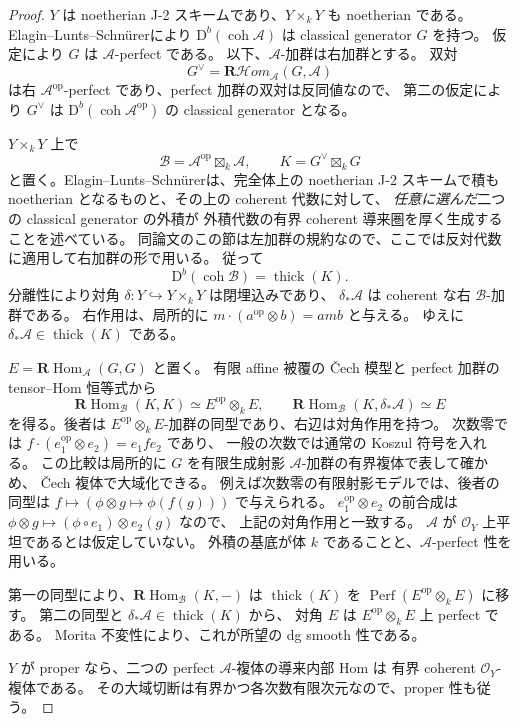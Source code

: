 \begin{proof}
$Y$ は noetherian J-2 スキームであり、$Y\times_kY$ も noetherian である。
Elagin--Lunts--Schn\"urer\cite[Theorem~4.15]{ELSSmoothAlgebras}により
$\mathrm D^b(\operatorname{coh}\mathscr A)$ は classical generator $G$ を持つ。
仮定により $G$ は $\mathscr A$-perfect である。
以下、$\mathscr A$-加群は右加群とする。
双対
\[
 G^\vee=\mathbf R\mathcal Hom_{\mathscr A}(G,\mathscr A)
\]
は右 $\mathscr A^{\mathrm{op}}$-perfect であり、perfect 加群の双対は反同値なので、
第二の仮定により $G^\vee$ は
$\mathrm D^b(\operatorname{coh}\mathscr A^{\mathrm{op}})$ の classical generator となる。

$Y\times_kY$ 上で
\[
 \mathscr B=\mathscr A^{\mathrm{op}}\boxtimes_k\mathscr A,
 \qquad K=G^\vee\boxtimes_kG
\]
と置く。Elagin--Lunts--Schn\"urer\cite[Theorem~4.18(b)]{ELSSmoothAlgebras}は、完全体上の
noetherian J-2 スキームで積も noetherian となるものと、その上の coherent 代数に対して、
\emph{任意に選んだ}二つの classical generator の外積が
外積代数の有界 coherent 導来圏を厚く生成することを述べている。
同論文のこの節は左加群の規約なので、ここでは反対代数に適用して右加群の形で用いる。
従って
\[
 \mathrm D^b(\operatorname{coh}\mathscr B)=\operatorname{thick}(K).
\]
分離性により対角 $\delta:Y\hookrightarrow Y\times_kY$ は閉埋込みであり、
$\delta_*\mathscr A$ は coherent な右 $\mathscr B$-加群である。
右作用は、局所的に
$m\cdot(a^{\mathrm{op}}\otimes b)=amb$ と与える。
ゆえに $\delta_*\mathscr A\in\operatorname{thick}(K)$ である。

$E=\mathbf R\operatorname{Hom}_{\mathscr A}(G,G)$ と置く。
有限 affine 被覆の \v Cech 模型と perfect 加群の tensor--Hom 恒等式から
\[
 \mathbf R\operatorname{Hom}_{\mathscr B}(K,K)
       \simeq E^{\mathrm{op}}\otimes_k E,
 \qquad
 \mathbf R\operatorname{Hom}_{\mathscr B}(K,\delta_*\mathscr A)
       \simeq E
\]
を得る。後者は $E^{\mathrm{op}}\otimes_kE$-加群の同型であり、右辺は対角作用を持つ。
次数零では $f\cdot(e_1^{\mathrm{op}}\otimes e_2)=e_1fe_2$ であり、
一般の次数では通常の Koszul 符号を入れる。
この比較は局所的に $G$ を有限生成射影 $\mathscr A$-加群の有界複体で表して確かめ、
\v Cech 複体で大域化できる。
例えば次数零の有限射影モデルでは、後者の同型は
$f\mapsto(\phi\otimes g\mapsto\phi(f(g)))$ で与えられる。
$e_1^{\mathrm{op}}\otimes e_2$ の前合成は
$\phi\otimes g\mapsto(\phi\circ e_1)\otimes e_2(g)$ なので、
上記の対角作用と一致する。
$\mathscr A$ が $\mathcal O_Y$ 上平坦であるとは仮定していない。
外積の基底が体 $k$ であることと、$\mathscr A$-perfect 性を用いる。

第一の同型により、$\mathbf R\operatorname{Hom}_{\mathscr B}(K,-)$ は
$\operatorname{thick}(K)$ を
$\operatorname{Perf}(E^{\mathrm{op}}\otimes_kE)$ に移す。
第二の同型と $\delta_*\mathscr A\in\operatorname{thick}(K)$ から、
対角 $E$ は $E^{\mathrm{op}}\otimes_kE$ 上 perfect である。
Morita 不変性により、これが所望の dg smooth 性である。

$Y$ が proper なら、二つの perfect $\mathscr A$-複体の導来内部 Hom は
有界 coherent $\mathcal O_Y$-複体である。
その大域切断は有界かつ各次数有限次元なので、proper 性も従う。
\end{proof}


